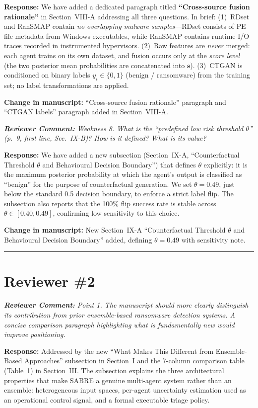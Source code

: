 \documentclass[11pt,a4paper]{article}
\newcommand{\RC}[1]{\begin{reviewbox}\textit{\textbf{Reviewer Comment:} #1}\end{reviewbox}}
\newcommand{\RS}[1]{\noindent\textcolor{responsegreen}{\textbf{Response:}} #1\par\medskip}
\newcommand{\CH}[1]{\noindent\textcolor{changebrown}{\textbf{Change in manuscript:}} #1\par\bigskip}
\begin{document}
\RS{We have added a dedicated paragraph titled \textbf{``Cross-source fusion
rationale''} in Section~VIII-A addressing all three questions. In brief:
(1)~RDset and RanSMAP contain \emph{no overlapping malware samples}---RDset
consists of PE file metadata from Windows executables, while RanSMAP contains
runtime I/O traces recorded in instrumented hypervisors. (2)~Raw features are
\emph{never} merged: each agent trains on its own dataset, and fusion occurs only
at the \emph{score level} (the two posterior mean probabilities are concatenated
into $\mathbf{s}$). (3)~CTGAN is conditioned on binary labels
$y_i \in \{0,1\}$ (benign / ransomware) from the training set; no label
transformations are applied.}

\CH{``Cross-source fusion rationale'' paragraph and ``CTGAN labels'' paragraph
added in Section~VIII-A.}

\RC{Weakness 8. What is the ``predefined low risk threshold $\theta$'' (p.~9, first
line, Sec.~IX-B)? How is it defined? What is its value?}

\RS{We have added a new subsection (Section~IX-A, ``Counterfactual Threshold
$\theta$ and Behavioural Decision Boundary'') that defines $\theta$ explicitly:
it is the maximum posterior probability at which the agent's output is classified
as ``benign'' for the purpose of counterfactual generation. We set $\theta = 0.49$,
just below the standard 0.5 decision boundary, to enforce a strict label flip.
The subsection also reports that the 100\% flip success rate is stable across
$\theta \in [0.40, 0.49]$, confirming low sensitivity to this choice.}

\CH{New Section~IX-A ``Counterfactual Threshold $\theta$ and Behavioural Decision
Boundary'' added, defining $\theta = 0.49$ with sensitivity note.}

\bigskip
\hrule
\bigskip

\section{Reviewer \#2}

\RC{Point 1. The manuscript should more clearly distinguish its contribution from
prior ensemble-based ransomware detection systems. A concise comparison paragraph
highlighting what is fundamentally new would improve positioning.}

\RS{Addressed by the new ``What Makes This Different from Ensemble-Based Approaches''
subsection in Section~I and the 7-column comparison table (Table~1) in Section~III.
The subsection explains the three architectural properties that make SABRE a genuine
multi-agent system rather than an ensemble: heterogeneous input spaces, per-agent
uncertainty estimation used as an operational control signal, and a formal executable
triage policy.}
\end{document}
